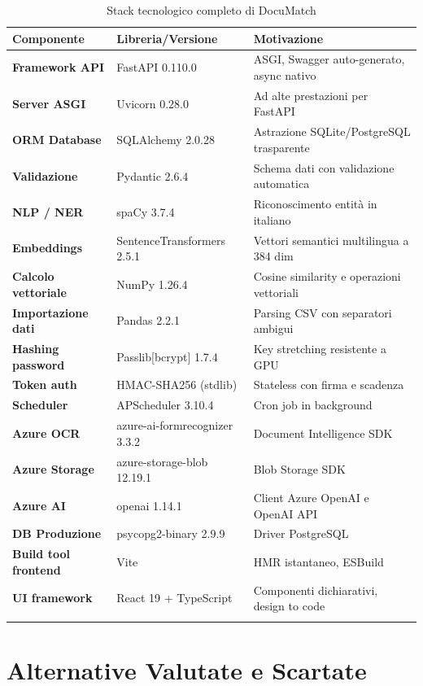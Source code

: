 \documentclass[12pt,a4paper,oneside]{report}
\begin{document}
\begin{longtable}{>{\bfseries}p{3.2cm} p{4.2cm} p{5cm}}
    \toprule
    \textbf{Componente} & \textbf{Libreria/Versione} & \textbf{Motivazione} \\
    \midrule
    \endhead
    Framework API & FastAPI 0.110.0 & ASGI, Swagger auto-generato, async nativo \\
    Server ASGI & Uvicorn 0.28.0 & Ad alte prestazioni per FastAPI \\
    ORM Database & SQLAlchemy 2.0.28 & Astrazione SQLite/PostgreSQL trasparente \\
    Validazione & Pydantic 2.6.4 & Schema dati con validazione automatica \\
    NLP / NER & spaCy 3.7.4 & Riconoscimento entit\`{a} in italiano \\
    Embeddings & SentenceTransformers 2.5.1 & Vettori semantici multilingua a 384 dim \\
    Calcolo vettoriale & NumPy 1.26.4 & Cosine similarity e operazioni vettoriali \\
    Importazione dati & Pandas 2.2.1 & Parsing CSV con separatori ambigui \\
    Hashing password & Passlib[bcrypt] 1.7.4 & Key stretching resistente a GPU \\
    Token auth & HMAC-SHA256 (stdlib) & Stateless con firma e scadenza \\
    Scheduler & APScheduler 3.10.4 & Cron job in background \\
    Azure OCR & azure-ai-formrecognizer 3.3.2 & Document Intelligence SDK \\
    Azure Storage & azure-storage-blob 12.19.1 & Blob Storage SDK \\
    Azure AI & openai 1.14.1 & Client Azure OpenAI e OpenAI API \\
    DB Produzione & psycopg2-binary 2.9.9 & Driver PostgreSQL \\
    Build tool frontend & Vite & HMR istantaneo, ESBuild \\
    UI framework & React 19 + TypeScript & Componenti dichiarativi, design to code \\
    \bottomrule
    \caption{Stack tecnologico completo di DocuMatch}
\end{longtable}

\section{Alternative Valutate e Scartate}
\end{document}
